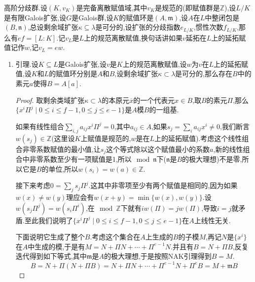 高阶分歧群.设$(K,v_K)$是完备离散赋值域,其中$v_K$是规范的(即赋值群是$\mathbb{Z}$),设$L/K$是有限Galois扩张,设$G$是Galois群,设$K$的赋值环是$(A,\mathfrak{m})$,设$A$在$L$中整闭包是$(B,\mathfrak{n})$,总设剩余域扩张$\kappa\subseteq\lambda$是可分的,设扩张的分歧指数$e_{L/K}$,惯性次数$f_{L/K}$,那么有$ef=[L:K]$.记$v_L$是$L$上的规范离散赋值,换句话讲如果$v$延拓在$L$上的延拓赋值记作$w$,记$v_L=ew$.
\begin{enumerate}
	\item 引理.设$K\subseteq L$是Galois扩张,设$v$是$K$上的规范离散赋值,设$w$为$v$在$L$上的延拓赋值,设$K$和$L$的赋值环分别是$A$和$B$,设剩余域扩张$\kappa\subset\lambda$是可分的,那么存在$B$中的素元$a$使得$B=A[a]$.
	\begin{proof}
		
		取剩余类域扩张$\kappa\subset\lambda$的本原元$\overline{x}$的一个代表元$x\in B$,取$B$的素元$\Pi$,那么$\{x^i\Pi^j\mid 0\le i\le f-1,0\le j\le e-1\}$是$A$模$B$的一组基.
		
		\qquad
		
		如果有线性组合$\sum_{i,j}a_{ij}x^i\Pi^j=0$,其中$a_{ij}\in A$,如果$s_j=\sum_ia_{ij}x^i\not=0$,我们断言$w(s_j)\in\mathbb{Z}$(这里设$K$上赋值是规范的,$w$是在$L$上的延拓赋值).考虑这个线性组合非零系数赋值的最小值,让$s_j$这个等式除以这个赋值最小的系数$a$,新的线性组合中非零系数至少有一项赋值是1,所以$\mod\mathfrak{n}$下($\mathfrak{n}$是$B$的极大理想)不是零,所以它是$B$的单位,所以$w(s_i)=w(a)\in\mathbb{Z}$.
		
		\qquad
		
		接下来考虑$0=\sum_js_j\Pi^j$.这其中非零项至少有两个赋值是相同的,因为如果$w(x)\not=w(y)$理应会有$w(x+y)=\min\{w(x),w(y)\}$.设$w(s_j\Pi^j)=w(s_i\Pi^i)$,在$\mod\mathbb{Z}$下就有$i w(\Pi)=j w(\Pi)$,导致$i=j$就矛盾.至此我们说明了$\{x^i\Pi^j\mid 0\le i\le f-1,0\le j\le e-1\}$在$A$上线性无关.
		
		\qquad
		
		下面说明它生成了整个$B$.考虑这个集合在$A$上生成的$B$的子模$M$,再记$N$是$\{x^i\}$在$A$中生成的模,于是有$M=N+\Pi N+\cdots+\Pi^{e-1}N$.并且有$B=N+\Pi B$,反复迭代得到如下等式,其中$\mathfrak{m}$是$A$的极大理想,于是按照NAK引理得到$B=M$.
		$$B=N+\Pi(N+\Pi B)=N+\Pi N+\cdots+\Pi^{e-1}N+\Pi^eB=M+\mathfrak{m}B$$
		
		\qquad
		

\end{proof}
\end{enumerate}
